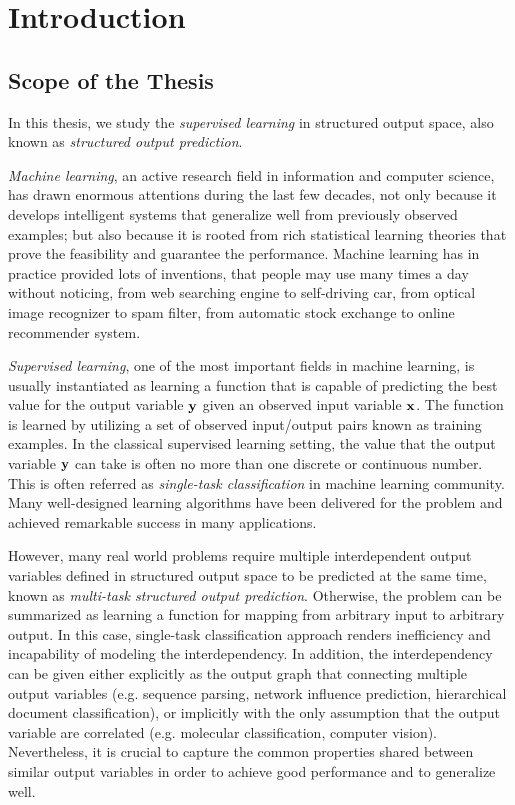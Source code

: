 





\chapter{Introduction}\label{ch_introduction}


%
%
\section{Scope of the Thesis}

In this thesis, we study the \textit{supervised learning} in structured output space, also known as \textit{structured output prediction}.

\textit{Machine learning}, an active research field in information and computer science, has drawn enormous attentions during the last few decades, not only because it develops intelligent systems that generalize well from previously observed examples; but also because it is rooted from rich statistical learning theories that prove the feasibility and guarantee the performance.
Machine learning has in practice provided lots of inventions, that people may use many times a day without noticing, from web searching engine to self-driving car, from optical image recognizer to spam filter, from automatic stock exchange to online recommender system.

\textit{Supervised learning}, one of the most important fields in {machine learning}, is usually instantiated as learning a function that is capable of predicting the best value for the output variable $\mathbf {y}$ given an observed input variable $\mathbf {x}$.
The function is learned by utilizing a set of observed input/output pairs known as training examples.
In the classical supervised learning setting, the value that the output variable $\mathbf {y}$ can take is often no more than one discrete or continuous number.
This is often referred as \textit{single-task classification} in machine learning community.
Many well-designed learning algorithms have been delivered for the problem and achieved remarkable success in many applications.

However, many real world problems require multiple interdependent output variables defined in structured output space to be predicted at the same time, known as \textit{multi-task structured output prediction}.
Otherwise, the problem can be summarized as learning a function for mapping from arbitrary input to arbitrary output.
In this case, single-task classification approach renders inefficiency and incapability of modeling the interdependency.
In addition, the interdependency can be given either explicitly as the output graph that connecting multiple output variables (e.g. sequence parsing, network influence prediction, hierarchical document classification), or implicitly with the only assumption that the output variable are correlated (e.g. molecular classification, computer vision).
Nevertheless, it is crucial to capture the common properties shared between similar output variables in order to achieve good performance and to generalize well.

